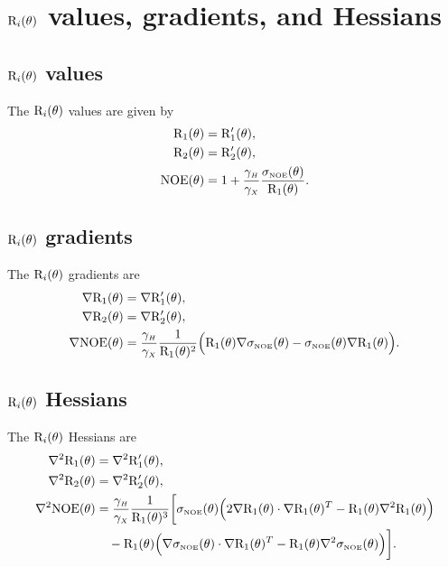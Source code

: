 
\section{$\mathrm{R}_i(\theta)$ values, gradients, and Hessians}


\subsection{$\mathrm{R}_i(\theta)$ values}

The $\mathrm{R}_i(\theta)$ values are given by
\begin{align}
    \mathrm{R}_1(\theta) & = \mathrm{R}_1'(\theta), \label{eq: Ri trans: R1} \\
    \mathrm{R}_2(\theta) & = \mathrm{R}_2'(\theta), \label{eq: Ri trans: R2} \\
    \mathrm{NOE}(\theta) & = 1 + \frac{\gamma_{\scriptscriptstyle H}}{\gamma_{\scriptscriptstyle X}} \frac{\sigma_{\scriptscriptstyle \mathrm{NOE}}(\theta)}{\mathrm{R}_1(\theta)}. \label{eq: Ri trans: NOE}
\end{align}


\subsection{$\mathrm{R}_i(\theta)$ gradients}

The $\mathrm{R}_i(\theta)$ gradients are
\begin{align}
    \nabla \mathrm{R}_1(\theta) & = \nabla \mathrm{R}_1'(\theta), \label{eq: Ri trans: dR1} \\
    \nabla \mathrm{R}_2(\theta) & = \nabla \mathrm{R}_2'(\theta), \label{eq: Ri trans: dR2} \\
    \nabla \mathrm{NOE}(\theta) & = \frac{\gamma_{\scriptscriptstyle H}}{\gamma_{\scriptscriptstyle X}} \frac{1}{\mathrm{R}_1(\theta)^2} \Big(
        \mathrm{R}_1(\theta) \nabla \sigma_{\scriptscriptstyle \mathrm{NOE}}(\theta) - \sigma_{\scriptscriptstyle \mathrm{NOE}}(\theta) \nabla \mathrm{R}_1(\theta)
    \Big). \label{eq: Ri trans: dNOE}
\end{align}


\subsection{$\mathrm{R}_i(\theta)$ Hessians}

The $\mathrm{R}_i(\theta)$ Hessians are
\begin{align}
    \nabla^2 \mathrm{R}_1(\theta) & = \nabla^2 \mathrm{R}_1'(\theta), \label{eq: Ri trans: d2R1} \\
    \nabla^2 \mathrm{R}_2(\theta) & = \nabla^2 \mathrm{R}_2'(\theta), \label{eq: Ri trans: d2R2} \\
    \nabla^2 \mathrm{NOE}(\theta) & = \frac{\gamma_{\scriptscriptstyle H}}{\gamma_{\scriptscriptstyle X}} \frac{1}{\mathrm{R}_1(\theta)^3} \bigg[
        \sigma_{\scriptscriptstyle \mathrm{NOE}}(\theta) \Big( 2 \nabla \mathrm{R}_1(\theta) \cdot \nabla \mathrm{R}_1(\theta)^T - \mathrm{R}_1(\theta) \nabla^2 \mathrm{R}_1(\theta) \Big) \nonumber\\
        & \quad - \mathrm{R}_1(\theta) \Big( \nabla \sigma_{\scriptscriptstyle \mathrm{NOE}}(\theta) \cdot \nabla \mathrm{R}_1(\theta)^T - \mathrm{R}_1(\theta) \nabla^2 \sigma_{\scriptscriptstyle \mathrm{NOE}}(\theta) \Big)
    \bigg]. \label{eq: Ri trans: d2NOE}
\end{align}




